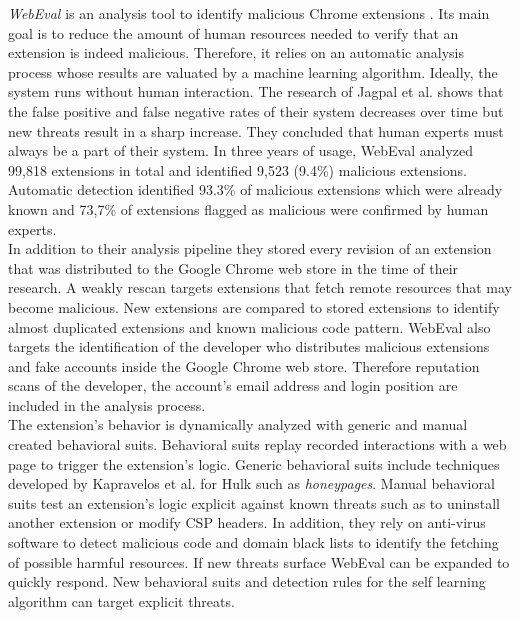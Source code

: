 	\textit{WebEval} is an analysis tool to identify malicious Chrome extensions \cite{190984}. Its main goal is to reduce the amount of human resources needed to verify that an extension is indeed malicious. Therefore, it relies on an automatic analysis process whose results are valuated by a machine learning algorithm. Ideally, the system runs without human interaction. The research of Jagpal et al. shows that the false positive and false negative rates of their system decreases over time but new threats result in a sharp increase. They concluded that human experts must always be a part of their system. In three years of usage, WebEval analyzed 99,818 extensions in total and identified 9,523 (9.4\%) malicious extensions. Automatic detection identified 93.3\% of malicious extensions which were already known and 73,7\% of extensions flagged as malicious were confirmed by human experts. \\
	In addition to their analysis pipeline they stored every revision of an extension that was distributed to the Google Chrome web store in the time of their research. A weakly rescan targets extensions that fetch remote resources that may become malicious. New extensions are compared to stored extensions to identify almost duplicated extensions and known malicious code pattern. WebEval also targets the identification of the developer who distributes malicious extensions and fake accounts inside the Google Chrome web store. Therefore reputation scans of the developer, the account's email address and login position are included in the analysis process.  \\
	The extension's behavior is dynamically analyzed with generic and manual created behavioral suits. Behavioral suits replay recorded interactions with a web page to trigger the extension's logic. Generic behavioral suits include techniques developed by Kapravelos	et al. for Hulk \cite{184485} such as \textit{honeypages}. Manual behavioral suits test an extension's logic explicit against known threats such as to uninstall another extension or modify CSP headers. In addition, they rely on anti-virus software to detect malicious code and domain black lists to identify the fetching of possible harmful resources. If new threats surface WebEval can be expanded to quickly respond. New behavioral suits and detection rules for the self learning algorithm can target explicit threats. 
	
